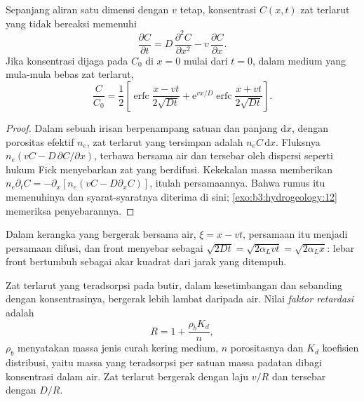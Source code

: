 \begin{theorem}\label{thm:b3:hydrogeology:ade}
Sepanjang aliran satu dimensi dengan  $v$ tetap,
konsentrasi $C(x, t)$ zat terlarut yang tidak bereaksi memenuhi
\[
\frac{\partial C}{\partial t} = D\,\frac{\partial^2C}{\partial x^2} -
v\,\frac{\partial C}{\partial x} .
\]
Jika konsentrasi dijaga pada $C_0$ di $x = 0$ mulai dari $t = 0$, dalam medium
yang mula-mula bebas zat terlarut,
\[
\frac{C}{C_0} = \frac12\left[\operatorname{erfc}\frac{x - vt}{2\sqrt{Dt}} +
\mathrm e^{vx/D}\operatorname{erfc}\frac{x + vt}{2\sqrt{Dt}}\right] .
\]
\end{theorem}

\begin{proof}
Dalam sebuah irisan berpenampang satuan dan panjang $\mathrm dx$, dengan
porositas efektif $n_e$, zat terlarut yang tersimpan adalah $n_eC\,\mathrm dx$. Fluksnya
$n_e(vC - D\,\partial C/\partial x)$, terbawa bersama air dan tersebar oleh
dispersi seperti hukum Fick menyebarkan zat yang berdifusi. Kekekalan massa memberikan
$n_e\partial_tC = -\partial_x[n_e(vC - D\partial_xC)]$, itulah persamaannya. Bahwa
rumus itu memenuhinya dan syarat-syaratnya diterima di sini;
\cref{exo:b3:hydrogeology:12} memeriksa penyebarannya.
\end{proof}

Dalam kerangka yang bergerak bersama air, $\xi = x - vt$, persamaan itu menjadi
persamaan difusi, dan front menyebar sebagai $\sqrt{2Dt} = \sqrt{2\alpha_L
vt} = \sqrt{2\alpha_Lx}$: lebar front bertumbuh sebagai akar kuadrat
dari jarak yang ditempuh.

\begin{definition}\label{def:b3:hydrogeology:retardation}
Zat terlarut yang teradsorpsi pada butir, dalam kesetimbangan dan sebanding
dengan konsentrasinya, bergerak lebih lambat daripada air. Nilai
\emph{faktor retardasi} adalah
\[
R = 1 + \frac{\rho_bK_d}{n} ,
\]
$\rho_b$ menyatakan massa jenis curah kering medium, $n$ porositasnya dan
$K_d$ koefisien distribusi, yaitu massa yang teradsorpsi per satuan massa
padatan dibagi konsentrasi dalam air. Zat terlarut bergerak dengan laju $v/R$
dan tersebar dengan $D/R$.
\end{definition}

